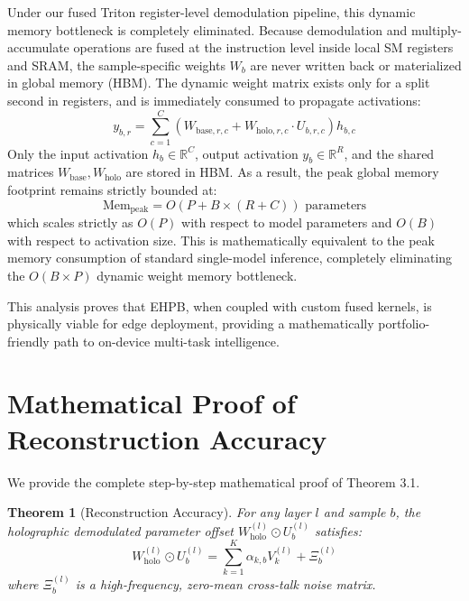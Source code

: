 \documentclass{article}
\theoremstyle{plain}
\newtheorem{theorem}{Theorem}[section]
\theoremstyle{definition}
\theoremstyle{remark}
\begin{document}
Under our fused Triton register-level demodulation pipeline, this dynamic memory bottleneck is completely eliminated. Because demodulation and multiply-accumulate operations are fused at the instruction level inside local SM registers and SRAM, the sample-specific weights $W_b$ are never written back or materialized in global memory (HBM). The dynamic weight matrix exists only for a split second in registers, and is immediately consumed to propagate activations:
\begin{equation}
y_{b, r} = \sum_{c=1}^C \left( W_{\text{base}, r, c} + W_{\text{holo}, r, c} \cdot U_{b, r, c} \right) h_{b, c}
\end{equation}
Only the input activation $h_b \in \mathbb{R}^C$, output activation $y_b \in \mathbb{R}^R$, and the shared matrices $W_{\text{base}}, W_{\text{holo}}$ are stored in HBM. As a result, the peak global memory footprint remains strictly bounded at:
\begin{equation}
\text{Mem}_{\text{peak}} = O(P + B \times (R + C)) \text{ parameters}
\end{equation}
which scales strictly as $O(P)$ with respect to model parameters and $O(B)$ with respect to activation size. This is mathematically equivalent to the peak memory consumption of standard single-model inference, completely eliminating the $O(B \times P)$ dynamic weight memory bottleneck. 

This analysis proves that EHPB, when coupled with custom fused kernels, is physically viable for edge deployment, providing a mathematically portfolio-friendly path to on-device multi-task intelligence.

\section{Mathematical Proof of Reconstruction Accuracy}
\label{app:theorem_proof}

We provide the complete step-by-step mathematical proof of Theorem 3.1.

\begin{theorem}[Reconstruction Accuracy]
For any layer $l$ and sample $b$, the holographic demodulated parameter offset $W_{\text{holo}}^{(l)} \odot U_b^{(l)}$ satisfies:
\begin{equation}
W_{\text{holo}}^{(l)} \odot U_b^{(l)} = \sum_{k=1}^K \alpha_{k, b} V_k^{(l)} + \Xi_b^{(l)}
\end{equation}
where $\Xi_b^{(l)}$ is a high-frequency, zero-mean cross-talk noise matrix.
\end{theorem}
\end{document}

